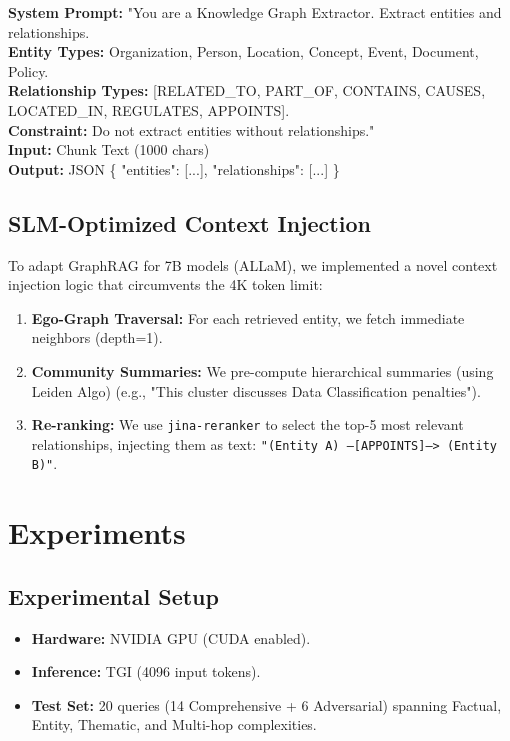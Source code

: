 \documentclass[11pt, onecolumn]{article}
\begin{document}
\begin{algorithm}[H]
\SetAlgoLined
\textbf{System Prompt:} "You are a Knowledge Graph Extractor. Extract entities and relationships.\\
\textbf{Entity Types:} Organization, Person, Location, Concept, Event, Document, Policy.\\
\textbf{Relationship Types:} [RELATED\_TO, PART\_OF, CONTAINS, CAUSES, LOCATED\_IN, REGULATES, APPOINTS].\\
\textbf{Constraint:} Do not extract entities without relationships."\\
\textbf{Input:} Chunk Text (1000 chars)\\
\textbf{Output:} JSON \{ "entities": [...], "relationships": [...] \}
\caption{Schema-Guided Extraction Prompt}
\label{alg:extraction}
\end{algorithm}

\subsection{SLM-Optimized Context Injection}
To adapt GraphRAG for 7B models (ALLaM), we implemented a novel context injection logic that circumvents the 4K token limit:
\begin{enumerate}
    \item \textbf{Ego-Graph Traversal:} For each retrieved entity, we fetch immediate neighbors (depth=1).
    \item \textbf{Community Summaries:} We pre-compute hierarchical summaries (using Leiden Algo) (e.g., "This cluster discusses Data Classification penalties").
    \item \textbf{Re-ranking:} We use \texttt{jina-reranker} to select the top-5 most relevant relationships, injecting them as text: \texttt{"(Entity A) --[APPOINTS]--> (Entity B)"}.
\end{enumerate}

\section{Experiments}
\subsection{Experimental Setup}
\begin{itemize}[noitemsep]
    \item \textbf{Hardware:} NVIDIA GPU (CUDA enabled).
    \item \textbf{Inference:} TGI (4096 input tokens).
    \item \textbf{Test Set:} 20 queries (14 Comprehensive + 6 Adversarial) spanning Factual, Entity, Thematic, and Multi-hop complexities.
\end{itemize}
\end{document}
